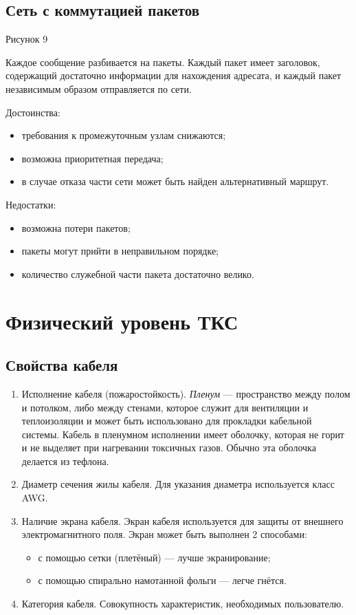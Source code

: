 \documentclass[12pt, russian, oneside, article]{ncc}
\begin{document}
\subsection{Сеть с коммутацией пакетов}
\label{sec-3_3}


Рисунок 9

Каждое сообщение разбивается на пакеты. Каждый пакет имеет заголовок, содержащий достаточно информации для нахождения адресата, и каждый пакет независимым образом отправляется по сети.

Достоинства:
\begin{itemize}
\item требования к промежуточным узлам снижаются;
\item возможна приоритетная передача;
\item в случае отказа части сети может быть найден альтернативный маршрут.
\end{itemize}

Недостатки:
\begin{itemize}
\item возможна потери пакетов;
\item пакеты могут прийти в неправильном порядке;
\item количество служебной части пакета достаточно велико.
\end{itemize}
\section{Физический уровень ТКС}
\label{sec-4}
\subsection{Свойства кабеля}
\label{sec-4_1}


\begin{enumerate}
\item Исполнение кабеля (пожаростойкость). \emph{Пленум} --- пространство между полом и потолком, либо между стенами, которое служит для вентиляции и теплоизоляции и может быть использовано для прокладки кабельной системы. Кабель в пленумном исполнении имеет оболочку, которая не горит и не выделяет при нагревании токсичных газов. Обычно эта оболочка делается из тефлона.
\item Диаметр сечения жилы кабеля. Для указания диаметра используется класс AWG.
\item Наличие экрана кабеля. Экран кабеля используется для защиты от внешнего электромагнитного поля. Экран может быть выполнен 2 способами:

\begin{itemize}
\item с помощью сетки (плетёный) --- лучше экранирование;
\item с помощью спирально намотанной фольги --- легче гнётся.
\end{itemize}

\item Категория кабеля. Совокупность характеристик, необходимых пользователю.
\end{enumerate}
\end{document}
